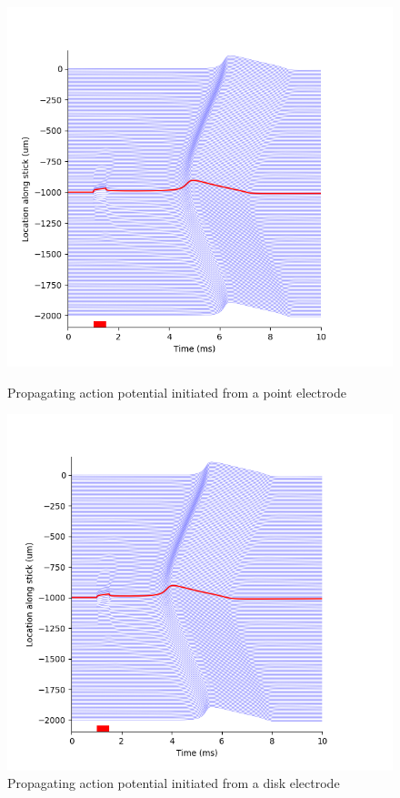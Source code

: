 \documentclass{article}
\begin{document}
    \begin{figure}[htbp]
        \centering
        \begin{minipage}[b]{0.49\textwidth}
            \includegraphics[width=\textwidth]{threshold_point}
            \caption{Propagating action potential initiated from a point electrode}
            \label{fig:threshold_point}
        \end{minipage}
        \hfill
        \begin{minipage}[b]{0.49\textwidth}
            \includegraphics[width=\textwidth]{threshold_disk}
            \caption{Propagating action potential initiated from a disk electrode}
            \label{fig:threshold_disk}
        \end{minipage}
    \end{figure}
\end{document}
